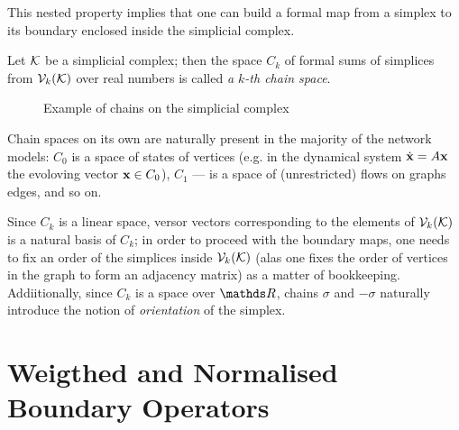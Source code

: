 This nested property implies that one can build a formal map from a simplex to its boundary enclosed inside the simplicial complex. 

\begin{definition}
      Let \( \mathcal{K} \) be a simplicial complex; then the space \( C_k \) of formal sums of simplices from \( \mathcal{V}_{k}(\mathcal{K}) \) over real numbers is called \emph{a \( k\)-th chain space}.
\end{definition}

\begin{example}    
      \begin{figure}[hbtp]
            \centering
            
            \caption{Example of chains on the simplicial complex \label{fig:weak_example}}
      \end{figure}
\end{example}

Chain spaces on its own are naturally present in the majority of the network models: \( C_0 \) is a space of states of vertices (e.g. in the dynamical system \( \dot{ \mathbf{x} } = A \mathbf{x} \) the evoloving vector \( \mathbf{x} \in C_0 \)), \( C_1 \) --- is a space of (unrestricted) flows on graphs edges, and so on.

Since \( C_k \) is a linear space, versor vectors corresponding to the elements of \( \mathcal{V}_{k}(\mathcal{K})\) is a natural basis of \( C_k \); in order to proceed with the boundary maps, one needs to fix an order of the simplices inside \( \mathcal{V}_{k}(\mathcal{K}) \) (alas one fixes the order of vertices in the graph to form an adjacency matrix) as a matter of bookkeeping. Addiitionally, since \( C_k \) is a space over \( \ds R \), chains \( \sigma \) and \( - \sigma \) naturally introduce the notion of \emph{orientation} of the simplex.













\section{ Weigthed and Normalised Boundary Operators}


